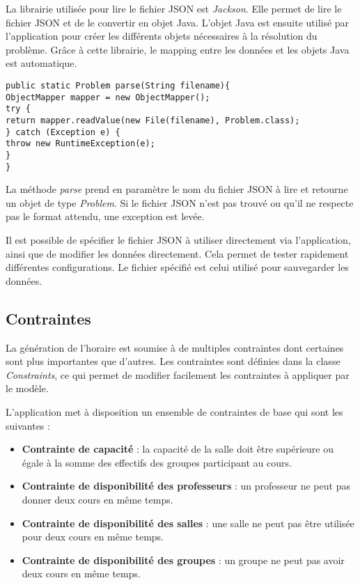 La librairie utilisée pour lire le fichier JSON est \textit{Jackson}. Elle permet de lire le fichier JSON et de le convertir en objet Java. L'objet Java est ensuite utilisé par l'application pour créer les différents objets nécessaires à la résolution du problème. Grâce à cette librairie, le mapping entre les données et les objets Java est automatique.

\begin{verbatim}
public static Problem parse(String filename){
ObjectMapper mapper = new ObjectMapper();
try {
return mapper.readValue(new File(filename), Problem.class);
} catch (Exception e) {
throw new RuntimeException(e);
}
}
\end{verbatim}

La méthode \textit{parse} prend en paramètre le nom du fichier JSON à lire et retourne un objet de type \textit{Problem}. Si le fichier JSON n'est pas trouvé ou qu'il ne respecte pas le format attendu, une exception est levée.

Il est possible de spécifier le fichier JSON à utiliser directement via l'application, ainsi que de modifier les données directement. Cela permet de tester rapidement différentes configurations. Le fichier spécifié est celui utilisé pour sauvegarder les données.

\subsection{Contraintes}

La génération de l'horaire est soumise à de multiples contraintes dont certaines sont plus importantes que d'autres. Les contraintes sont définies dans la classe \textit{Constraints}, ce qui permet de modifier facilement les contraintes à appliquer par le modèle.

L'application met à disposition un ensemble de contraintes de base qui sont les suivantes :
\begin{itemize}
    \item \textbf{Contrainte de capacité} : la capacité de la salle doit être supérieure ou égale à la somme des effectifs des groupes participant au cours.
    \item \textbf{Contrainte de disponibilité des professeurs} : un professeur ne peut pas donner deux cours en même temps.
    \item \textbf{Contrainte de disponibilité des salles} : une salle ne peut pas être utilisée pour deux cours en même temps.
    \item \textbf{Contrainte de disponibilité des groupes} : un groupe ne peut pas avoir deux cours en même temps.
\end{itemize}

